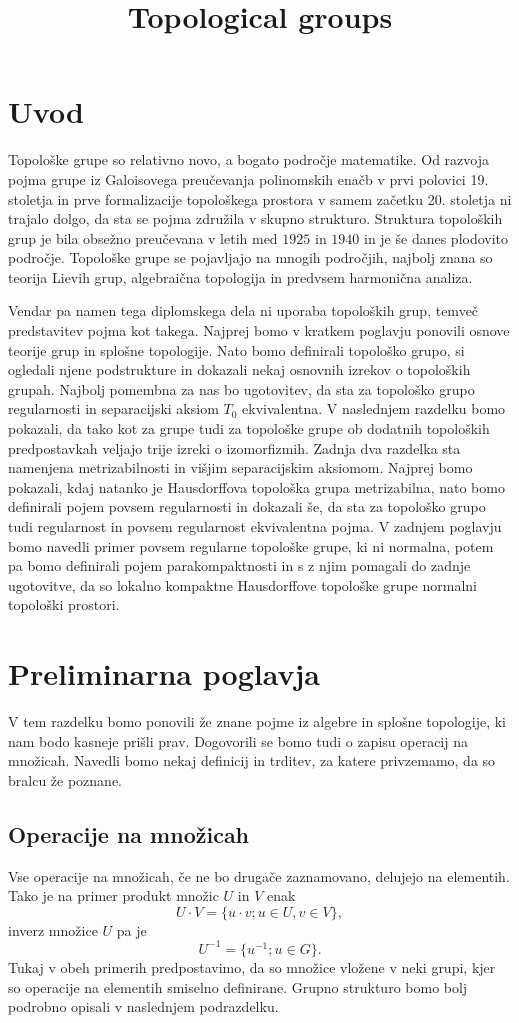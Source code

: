 \documentclass[mat1]{fmfdelo}
\title{Topological groups}
\begin{document}
\section{Uvod}
Topološke grupe so relativno novo, a bogato področje matematike. Od razvoja pojma grupe iz Galoisovega preučevanja polinomskih enačb v prvi polovici 19. stoletja in prve formalizacije topološkega prostora v samem začetku 20. stoletja ni trajalo dolgo, da sta se pojma združila v skupno strukturo. Struktura topoloških grup je bila obsežno preučevana v letih med $1925$ in $1940$ in je še danes plodovito področje. Topološke grupe se pojavljajo na mnogih področjih, najbolj znana so teorija Lievih grup, algebraična topologija in predvsem harmonična analiza.

Vendar pa namen tega diplomskega dela ni uporaba topoloških grup, temveč predstavitev pojma kot takega. Najprej bomo v kratkem poglavju ponovili osnove teorije grup in splošne topologije. Nato bomo definirali topološko grupo, si ogledali njene podstrukture in dokazali nekaj osnovnih izrekov o topoloških grupah. Najbolj pomembna za nas bo ugotovitev, da sta za topološko grupo regularnosti in separacijski aksiom $T_0$ ekvivalentna. V naslednjem razdelku bomo pokazali, da tako kot za grupe tudi za topološke grupe ob dodatnih topoloških predpostavkah veljajo trije izreki o izomorfizmih. Zadnja dva razdelka sta namenjena metrizabilnosti in višjim separacijskim aksiomom. Najprej bomo pokazali, kdaj natanko je Hausdorffova topološka grupa metrizabilna, nato bomo definirali pojem povsem regularnosti in dokazali še, da sta za topološko grupo tudi regularnost in povsem regularnost ekvivalentna pojma. V zadnjem poglavju bomo navedli primer povsem regularne topološke grupe, ki ni normalna, potem pa bomo definirali pojem parakompaktnosti in s z njim pomagali do zadnje ugotovitve, da so lokalno kompaktne Hausdorffove topološke grupe normalni topološki prostori.

\section{Preliminarna poglavja}
V tem razdelku bomo ponovili že znane pojme iz algebre in splošne topologije, ki nam bodo kasneje prišli prav. Dogovorili se bomo tudi o zapisu operacij na množicah. Navedli bomo nekaj definicij in trditev, za katere privzemamo, da so bralcu že poznane.

\subsection{Operacije na množicah}\label{sec:opnamnozicah}
Vse operacije na množicah, če ne bo drugače za\-zna\-mo\-va\-no, delujejo na elementih. Tako je na primer produkt množic $U$ in $V$ enak \[U \cdot V = \lbrace u \cdot v ; u \in U, v \in V \rbrace, \] inverz množice $U$ pa je \[ U^{-1} = \lbrace u^{-1} ; u \in G \rbrace. \] Tukaj v obeh primerih predpostavimo, da so množice vložene v neki grupi, kjer so operacije na elementih smiselno definirane. Grupno strukturo bomo bolj podrobno opisali v naslednjem podrazdelku.
\end{document}
